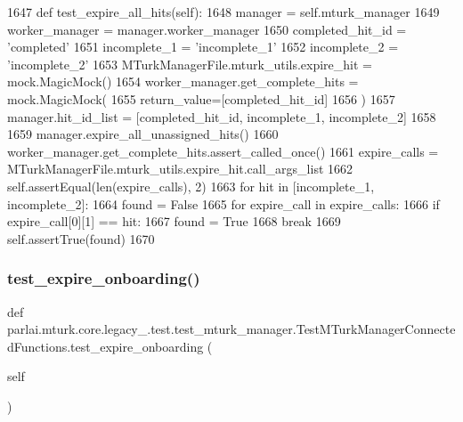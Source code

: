 \begin{DoxyCode}
1647     \textcolor{keyword}{def }test\_expire\_all\_hits(self):
1648         manager = self.mturk\_manager
1649         worker\_manager = manager.worker\_manager
1650         completed\_hit\_id = \textcolor{stringliteral}{'completed'}
1651         incomplete\_1 = \textcolor{stringliteral}{'incomplete\_1'}
1652         incomplete\_2 = \textcolor{stringliteral}{'incomplete\_2'}
1653         MTurkManagerFile.mturk\_utils.expire\_hit = mock.MagicMock()
1654         worker\_manager.get\_complete\_hits = mock.MagicMock(
1655             return\_value=[completed\_hit\_id]
1656         )
1657         manager.hit\_id\_list = [completed\_hit\_id, incomplete\_1, incomplete\_2]
1658 
1659         manager.expire\_all\_unassigned\_hits()
1660         worker\_manager.get\_complete\_hits.assert\_called\_once()
1661         expire\_calls = MTurkManagerFile.mturk\_utils.expire\_hit.call\_args\_list
1662         self.assertEqual(len(expire\_calls), 2)
1663         \textcolor{keywordflow}{for} hit \textcolor{keywordflow}{in} [incomplete\_1, incomplete\_2]:
1664             found = \textcolor{keyword}{False}
1665             \textcolor{keywordflow}{for} expire\_call \textcolor{keywordflow}{in} expire\_calls:
1666                 \textcolor{keywordflow}{if} expire\_call[0][1] == hit:
1667                     found = \textcolor{keyword}{True}
1668                     \textcolor{keywordflow}{break}
1669             self.assertTrue(found)
1670 
\end{DoxyCode}
\mbox{\label{classparlai_1_1mturk_1_1core_1_1legacy__2018_1_1test_1_1test__mturk__manager_1_1TestMTurkManagerConnectedFunctions_a9ddb561032391b12e01e677412abdd38}} 
\subsubsection{\texorpdfstring{test\+\_\+expire\+\_\+onboarding()}{test\_expire\_onboarding()}}
{\footnotesize\ttfamily def parlai.\+mturk.\+core.\+legacy\+\_.\+test.\+test\+\_\+mturk\+\_\+manager.\+Test\+M\+Turk\+Manager\+Connected\+Functions.\+test\+\_\+expire\+\_\+onboarding (\begin{DoxyParamCaption}\item[{}]{self }\end{DoxyParamCaption})}



